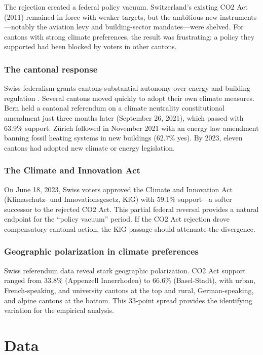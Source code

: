 \documentclass[12pt]{article}
\begin{document}
The rejection created a federal policy vacuum. Switzerland's existing CO2 Act (2011) remained in force with weaker targets, but the ambitious new instruments---notably the aviation levy and building-sector mandates---were shelved. For cantons with strong climate preferences, the result was frustrating: a policy they supported had been blocked by voters in other cantons.

\subsubsection*{The cantonal response} Swiss federalism grants cantons substantial autonomy over energy and building regulation \citep{ladner2019swiss}. Several cantons moved quickly to adopt their own climate measures. Bern held a cantonal referendum on a climate neutrality constitutional amendment just three months later (September 26, 2021), which passed with 63.9\% support. Z\"urich followed in November 2021 with an energy law amendment banning fossil heating systems in new buildings (62.7\% yes). By 2023, eleven cantons had adopted new climate or energy legislation.

\subsubsection*{The Climate and Innovation Act} On June 18, 2023, Swiss voters approved the Climate and Innovation Act (Klimaschutz- und Innovationsgesetz, KlG) with 59.1\% support---a softer successor to the rejected CO2 Act. This partial federal reversal provides a natural endpoint for the ``policy vacuum'' period. If the CO2 Act rejection drove compensatory cantonal action, the KlG passage should attenuate the divergence.

\subsubsection*{Geographic polarization in climate preferences} Swiss referendum data reveal stark geographic polarization. CO2 Act support ranged from 33.8\% (Appenzell Innerrhoden) to 66.6\% (Basel-Stadt), with urban, French-speaking, and university cantons at the top and rural, German-speaking, and alpine cantons at the bottom. This 33-point spread provides the identifying variation for the empirical analysis.


\section{Data}
\label{sec:data}
\end{document}
